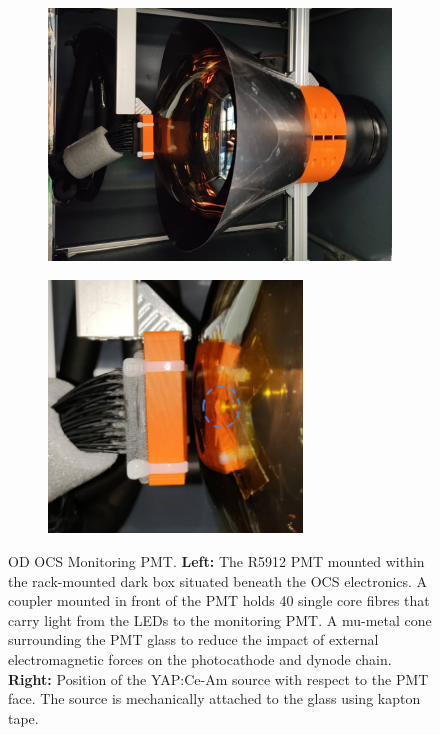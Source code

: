 \begin{figure}[ht!]
     \centering
     \begin{subfigure}[b]{0.47\textwidth}
         \centering
         \includegraphics[width=\textwidth]{figures/ODCommissioning/MonitoringPMT.png}
     \end{subfigure}
     \hfill
     \begin{subfigure}[b]{0.47\textwidth}
         \centering
         \includegraphics[width=0.74\textwidth]{figures/ODCommissioning/YAPCeSource.png}
     \end{subfigure}
        \caption{OD OCS Monitoring PMT. \textbf{Left:} The R5912 PMT mounted within the rack-mounted dark box situated beneath the OCS electronics. A coupler mounted in front of the PMT holds 40 single core fibres that carry light from the LEDs to the monitoring PMT. A mu-metal cone surrounding the PMT glass to reduce the impact of external electromagnetic forces on the photocathode and dynode chain. \textbf{Right: }Position of the YAP:Ce-Am source with respect to the PMT face. The source is mechanically attached to the glass using kapton tape.}
        \label{fig:ODCommissioning/MonPMT_YAPCeSource}
\end{figure}
